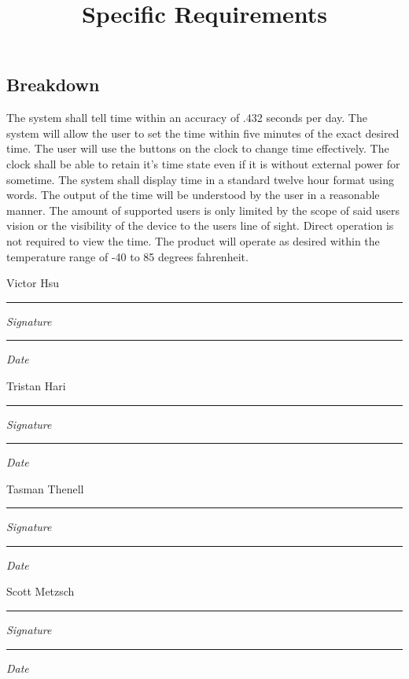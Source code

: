 \documentclass[10pt,draftclsnofoot,onecolumn]{IEEEtran}
\newcommand{\namesigdate}[2][7cm]{%
\begin{minipage}{#1}
    #2 \vspace{1.0cm}\hrule\smallskip
    \small \textit{Signature}
    \vspace{1.0cm}\hrule\smallskip
    \small \textit{Date}
\end{minipage}
}
\begin{document}
\newpage
\title{Specific Requirements}
\subsection{Breakdown}
The system shall tell time within an accuracy of .432 seconds per day. The system will allow
the user to set the time within five minutes of the exact desired time. The user will use the
buttons on the clock to change time effectively. The clock shall be able to retain it’s time
state even if it is without external power for sometime. The system shall display time in a
standard twelve hour format using words. The output of the time will be understood by the user
in a reasonable manner. The amount of supported users is only limited by the scope of said
users vision or the visibility of the device to the users line of sight. Direct operation is
not required to view the time. The product will operate as desired within the temperature
range of -40 to 85 degrees fahrenheit.

\newpage

\noindent \namesigdate{Victor Hsu} \hfill \namesigdate{Tristan Hari} \par
\vspace{2cm}
\noindent \namesigdate{Tasman Thenell} \hfill \namesigdate{Scott Metzsch}
\end{document}
